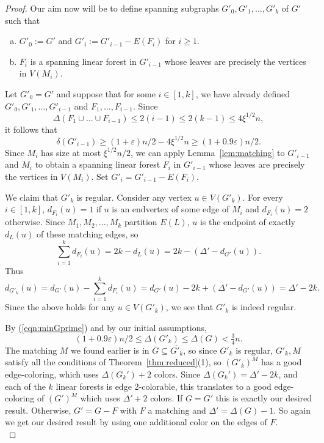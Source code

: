 \documentclass[11pt, oneside]{article}
\newcommand{\ve}{\varepsilon}
\begin{document}
\begin{proof}
Our aim now will be to  define spanning subgraphs $G'_0,G'_1,\ldots, G'_k$ of $G'$ such that
 \begin{enumerate}[(a)]
	 	\item $G'_0:=G'$ and $G'_i:=G'_{i-1}- E(F_i)$ for $i\geq 1$.
	 	\item $F_i$ is a spanning linear forest in $G'_{i-1}$ whose leaves are precisely the vertices in $V(M_i)$.
	 \end{enumerate}
Let $G'_0=G'$ and suppose that for some $i\in [1,k]$, we have already defined $G'_0,G'_1,\ldots,G'_{i-1}$ and $F_1,\ldots,F_{i-1}$. Since $$\Delta(F_1\cup\ldots \cup F_{i-1})\leq 2(i-1)\leq 2(k-1)\leq 4\xi^{1/2} n,$$
it follows that 
\begin{equation}\label{eqn:minGprime}
\delta(G'_{i-1})\geq (1+\ve)n/2-4\xi^{1/2} n \geq (1+0.9\ve)n/2.
\end{equation}
Since $M_i$ has size at most $\xi^{1/2} n/2$,  we can apply Lemma~\ref{lem:matching} to $G'_{i-1}$ and $M_i$ to obtain a spanning linear forest $F_i$ in $G'_{i-1}$ whose leaves are precisely the vertices in $V(M_i)$. Set $G'_i=G'_{i-1}-E(F_i)$.

	
We claim that $G'_k$  is regular. Consider any vertex $u\in V(G'_k)$. For every $i\in [1,k]$, $d_{F_i}(u)=1$ if $u$ is an endvertex of some edge of $M_i$ and $d_{F_i}(u)=2$ otherwise. Since $M_1,M_2,\ldots,M_k$ partition $E(L)$, $u$ is the endpoint of exactly $d_L(u)$ of these matching edges, so
$$\sum\limits_{i=1}^{k}d_{F_i}(u)=2k-d_{L}(u)=2k-(\Delta'-d_{G'}(u)).$$ 
Thus $$d_{G'_{k}}(u)=d_{G'}(u)-\sum\limits_{i=1}^{k}d_{F_i}(u)=d_{G'}(u)-2k+(\Delta'-d_{G'}(u)) =\Delta'-2k.$$
Since the above holds for any $u\in V(G'_k)$, we see that $G'_k$ is indeed regular.

By (\ref{eqn:minGprime}) and by our initial assumptions,
$$(1+0.9\ve)n/2\leq \Delta(G'_k) \leq \Delta(G)< \tfrac{3}{4}{n}.$$
The matching $M$ we found earlier is in $\overline{G}\subseteq \overline{G'_k}$, so since $G'_k$ is regular, $G'_k, M$ satisfy all the conditions of 
Theorem~\ref{thm:reduced}(1), so $(G'_k)^M$ has a good edge-coloring, which uses $\Delta(G_k')+2$ colors.  Since $\Delta(G_k')=\Delta'-2k$, and each of the $k$ linear forests is edge 2-colorable, this translates to a good edge-coloring of $(G')^M$ which uses $\Delta'+2$ colors. If $G=G'$ this is exactly our desired result. Otherwise, $G'=G-F$ with $F$ a matching and $\Delta'=\Delta(G)-1$. So again we get our desired result by using one additional color on the edges of $F$.\\



\end{proof}
\end{document}

